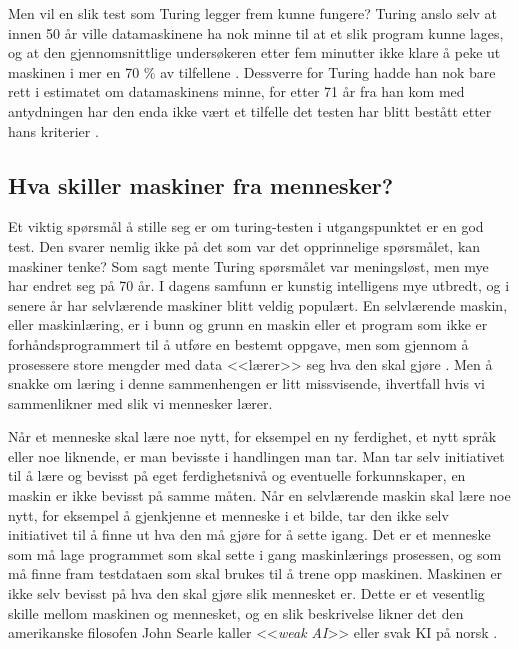 Men vil en slik test som Turing legger frem kunne fungere? Turing anslo selv at innen 50 år ville datamaskinene ha nok minne til at et slik program kunne lages,
og at den gjennomsnittlige undersøkeren etter fem minutter ikke klare å peke ut maskinen i mer en 70 \% av tilfellene \autocite[442]{Turing1950}. 
Dessverre for Turing hadde han nok bare rett i estimatet om datamaskinens minne, for etter 71 år fra han kom med antydningen har den enda ikke vært et tilfelle det testen har blitt bestått etter hans kriterier \autocites[5]{Kiran2013}[]{turingTest}.

\subsection{Hva skiller maskiner fra mennesker?}

Et viktig spørsmål å stille seg er om turing-testen i utgangspunktet er en god test. 
Den svarer nemlig ikke på det som var det opprinnelige spørsmålet, kan maskiner tenke? 
Som sagt mente Turing spørsmålet var meningsløst, men mye har endret seg på 70 år. 
I dagens samfunn er kunstig intelligens mye utbredt, og i senere år har selvlærende maskiner blitt veldig populært.
En selvlærende maskin, eller maskinlæring, er i bunn og grunn en maskin eller et program som ikke er forhåndsprogrammert til å utføre en bestemt oppgave, 
men som gjennom å prosessere store mengder med data <<lærer>> seg hva den skal gjøre \autocite[3]{Kiran2013}. Men å snakke om læring i denne sammenhengen er litt missvisende, ihvertfall hvis vi sammenlikner med slik vi mennesker lærer. 

Når et menneske skal lære noe nytt, for eksempel en ny ferdighet, et nytt språk eller noe liknende, er man bevisste i handlingen man tar. 
Man tar selv initiativet til å lære og bevisst på eget ferdighetsnivå og eventuelle forkunnskaper, en maskin er ikke bevisst på samme måten. 
Når en selvlærende maskin skal lære noe nytt, for eksempel å gjenkjenne et menneske i et bilde, tar den ikke selv initiativet til å finne ut hva den må gjøre for å sette igang. 
Det er et menneske som må lage programmet som skal sette i gang maskinlærings prosessen, 
og som må finne fram testdataen som skal brukes til å trene opp maskinen. 
Maskinen er ikke selv bevisst på hva den skal gjøre slik mennesket er. 
Dette er et vesentlig skille mellom maskinen og mennesket, 
og en slik beskrivelse likner det den amerikanske filosofen John Searle kaller <<\textit{weak AI}>> eller svak KI på norsk \autocite[9]{Kiran2013}.

